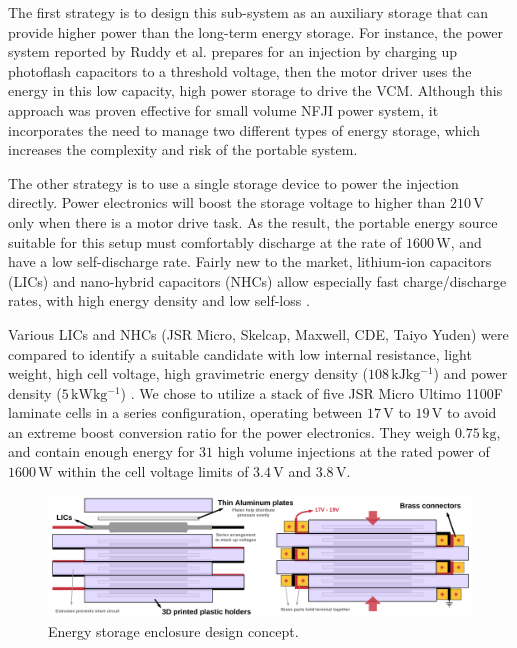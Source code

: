     
    The first strategy is to design this sub-system as an auxiliary storage that can provide higher power than the long-term energy storage. For instance, the power system reported by Ruddy et al. \cite{Ruddy2017} prepares for an injection by charging up photoflash capacitors to a threshold voltage, then the motor driver uses the energy in this low capacity, high power storage to drive the VCM.  Although this approach was proven effective for small volume NFJI power system, it incorporates the need to manage two different types of energy storage, which increases the complexity and risk of the portable system.
    
    The other strategy is to use a single storage device to power the injection directly. Power electronics will boost the storage voltage to higher than $210\,\mathrm{V}$ only when there is a motor drive task. As the result, the portable energy source suitable for this setup must comfortably discharge at the rate of $1600\,\mathrm{W}$, and have a low self-discharge rate. Fairly new to the market, lithium-ion capacitors (LICs) and nano-hybrid capacitors (NHCs) allow especially fast charge/discharge rates, with high energy density and low self-loss \cite{Naoi2012}.
    
    
    Various LICs and NHCs (JSR Micro, Skelcap, Maxwell, CDE, Taiyo Yuden) were compared to identify a suitable candidate with low internal resistance, light weight, high cell voltage, high gravimetric energy density ($108\,\mathrm{kJ kg^{-1}}$) and power density ($5\,\mathrm{kW kg^{-1}}$) \cite{Naoi2012}. We chose to utilize a stack of five JSR Micro Ultimo 1100F laminate cells in a series configuration, operating between $17\,\mathrm{V}$ to $19\,\mathrm{V}$ to avoid an extreme boost conversion ratio for the power electronics. They weigh $0.75\,\mathrm{kg}$, and contain enough energy for $31$ high volume injections at the rated power of $1600\,\mathrm{W}$ within the cell voltage limits of $3.4\,\mathrm{V}$ and $3.8\,\mathrm{V}$.
    


    \begin{landscape}
        \begin{figure}[t]
          \centering
          \includegraphics[width=8.5in]{appA/images/Battery_stacking_v7.pdf}
          \caption{Energy storage enclosure design concept.}
          \label{fig:energy_storage_design_concept}
        \end{figure}
    \end{landscape}
    

